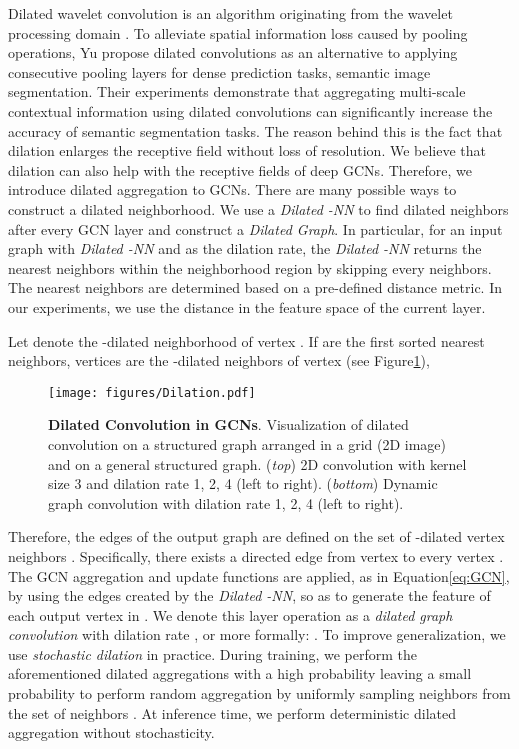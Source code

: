 \documentclass[10pt,twocolumn,letterpaper]{article}
\newcommand{\figLabel}{Figure\xspace}
\newcommand{\eqLabel}{Equation\xspace}
\begin{document}
Dilated wavelet convolution is an algorithm originating from the wavelet processing domain \cite{holschneider1990real,shensa1992discrete}. To alleviate spatial information loss caused by pooling operations, Yu \etal \cite{yu2015multi} propose dilated convolutions as an alternative to applying consecutive pooling layers for dense prediction tasks, \eg semantic image segmentation. Their experiments demonstrate that aggregating multi-scale contextual information using dilated convolutions can significantly increase the accuracy of semantic segmentation tasks. The reason behind this is the fact that dilation enlarges the receptive field without loss of resolution. We believe that dilation can also help with the receptive fields of deep GCNs. Therefore, we introduce dilated aggregation to GCNs. There are many possible ways to construct a dilated neighborhood. We use a \emph{Dilated -NN} to find dilated neighbors after every GCN layer and construct a \emph{Dilated Graph}. In particular, for an input graph   with \emph{Dilated -NN} and  as the dilation rate, the \emph{Dilated -NN} returns the  nearest neighbors within the  neighborhood region by skipping every  neighbors. The nearest neighbors are determined based on a pre-defined distance metric. In our experiments, we use the  distance in the feature space of the current layer. 

Let  denote the -dilated neighborhood of vertex . If  are the first sorted  nearest neighbors, vertices  are the -dilated neighbors of vertex  (see \figLabel \ref{fig:dilation_viz}), \ie 


\begin{figure}[!htb]
    \centering
    \texttt{[image: figures/Dilation.pdf]}
    \caption{\textbf{Dilated Convolution in GCNs}. Visualization of dilated convolution on a structured graph arranged in a grid (\eg 2D image) and on a general structured graph. (\emph{top}) 2D convolution with kernel size 3 and dilation rate 1, 2, 4 (left to right). (\emph{bottom}) Dynamic graph convolution with dilation rate 1, 2, 4 (left to right).}
\label{fig:dilation_viz}
\end{figure}

Therefore, the edges  of the output graph are defined on the set of -dilated vertex neighbors . Specifically, there exists a directed edge  from vertex  to every vertex . The GCN aggregation and update functions are applied, as in \eqLabel \eqref{eq:GCN}, by using the edges  created by the \emph{Dilated -NN}, so as to generate the feature  of each output vertex in . We denote this layer operation as a \emph{dilated graph convolution} with dilation rate , or more formally: . To improve generalization, we use \emph{stochastic dilation} in practice. During training, we perform the aforementioned dilated aggregations with a high probability  leaving a small probability  to perform random aggregation by uniformly sampling  neighbors from the set of  neighbors . At inference time, we perform deterministic dilated aggregation without stochasticity.
\end{document}
